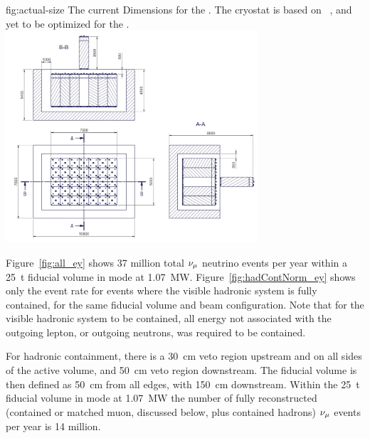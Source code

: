 \begin{dunefigure}{fig:actual-size}
{The current  Dimensions for the   . The cryostat is based on ~\cite{Abi:2017aow}, and yet to be optimized for the   .}
	\includegraphics[width=0.7\textwidth]{graphics/actual-size.png}
\end{dunefigure}

\label{sec:rates}

Figure~\ref{fig:all_ey} shows 37 million total  $\nu_\mu$ neutrino events per year within a \SI{25}{\tonne} fiducial volume in  mode at \SI{1.07}{\mega\watt}. Figure~\ref{fig:hadContNorm_ey} shows only the event rate for events where the visible hadronic system is fully contained, for the same fiducial volume and beam configuration. Note that for the visible hadronic system to be contained, all energy not associated with the outgoing lepton, or outgoing neutrons, was required to be contained. 


For hadronic containment, there is a \SI{30}{\centi\metre} veto region upstream and on all sides of the active volume, and \SI{50}{\centi\metre} veto region downstream. The fiducial volume is then defined as \SI{50}{\centi\metre} from all edges, with \SI{150}{\centi\metre} downstream.  Within the \SI{25}{\tonne} fiducial volume in  mode at \SI{1.07}{\mega\watt} the number of fully reconstructed (contained or matched muon, discussed below, plus contained hadrons)  $\nu_\mu$ events per year is 14 million.   

